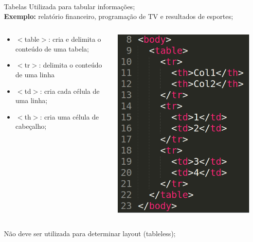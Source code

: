 \documentclass{beamer}
\begin{document}
\begin{frame}{Tabelas}
       \small
  Utilizada para tabular informações;\\
  \textbf{Exemplo:} relatório financeiro, programação de TV e resultados de 
esportes;
    \begin{columns}
    \begin{column}{0.5 \textwidth}
 
     \begin{itemize}
      \item $<$table$>$: cria e delimita o conteúdo de uma tabela;
       \item $<$tr$>$: delimita o conteúdo de uma linha 
       \item $<$td$>$: cria cada célula de uma linha;
       \item $<$th$>$: cria uma célula de cabeçalho;
     \end{itemize}
    \end{column}
    
    \begin{column}{0.45\textwidth}
     \includegraphics[height=0.5\paperheight]{fig/aula2/aula4_3.png}
    \end{column}
  \end{columns}
  
  \tiny{Não deve ser utilizada para determinar layout (tableless);}
\end{frame}
\end{document}
